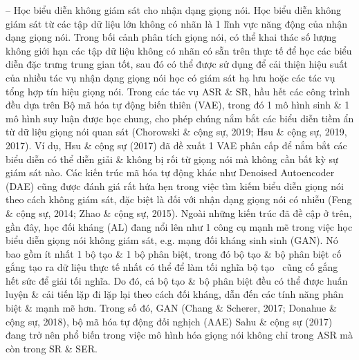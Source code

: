 \documentclass{article}
\begin{document}
\begin{itemize}
\begin{itemize}
\begin{itemize}
            -- Học biểu diễn không giám sát cho nhận dạng giọng nói. Học biểu diễn không giám sát từ các tập dữ liệu lớn không có nhãn là 1 lĩnh vực năng động của nhận dạng giọng nói. Trong bối cảnh phân tích giọng nói, có thể khai thác số lượng không giới hạn các tập dữ liệu không có nhãn có sẵn trên thực tế để học các biểu diễn đặc trưng trung gian tốt, sau đó có thể được sử dụng để cải thiện hiệu suất của nhiều tác vụ nhận dạng giọng nói học có giám sát hạ lưu hoặc các tác vụ tổng hợp tín hiệu giọng nói. Trong các tác vụ ASR \& SR, hầu hết các công trình đều dựa trên Bộ mã hóa tự động biến thiên (VAE), trong đó 1 mô hình sinh \& 1 mô hình suy luận được học chung, cho phép chúng nắm bắt các biểu diễn tiềm ẩn từ dữ liệu giọng nói quan sát (Chorowski \& cộng sự, 2019; Hsu \& cộng sự, 2019, 2017). Ví dụ, Hsu \& cộng sự (2017) đã đề xuất 1 VAE phân cấp để nắm bắt các biểu diễn có thể diễn giải \& không bị rối từ giọng nói mà không cần bất kỳ sự giám sát nào. Các kiến trúc mã hóa tự động khác như Denoised Autoencoder (DAE) cũng được đánh giá rất hứa hẹn trong việc tìm kiếm biểu diễn giọng nói theo cách không giám sát, đặc biệt là đối với nhận dạng giọng nói có nhiễu (Feng \& cộng sự, 2014; Zhao \& cộng sự, 2015). Ngoài những kiến trúc đã đề cập ở trên, gần đây, học đối kháng (AL) đang nổi lên như 1 công cụ mạnh mẽ trong việc học biểu diễn giọng nói không giám sát, e.g. mạng đối kháng sinh sinh (GAN). Nó bao gồm ít nhất 1 bộ tạo \& 1 bộ phân biệt, trong đó bộ tạo \& bộ phân biệt cố gắng tạo ra dữ liệu thực tế nhất có thể để làm tối nghĩa bộ tạo \ cũng cố gắng hết sức để giải tối nghĩa. Do đó, cả bộ tạo \& bộ phân biệt đều có thể được huấn luyện \& cải tiến lặp đi lặp lại theo cách đối kháng, dẫn đến các tính năng phân biệt \& mạnh mẽ hơn. Trong số đó, GAN (Chang \& Scherer, 2017; Donahue \& cộng sự, 2018), bộ mã hóa tự động đối nghịch (AAE) Sahu \& cộng sự (2017) đang trở nên phổ biến trong việc mô hình hóa giọng nói không chỉ trong ASR mà còn trong SR \& SER.


\end{itemize}
\end{itemize}
\end{itemize}
\end{document}
